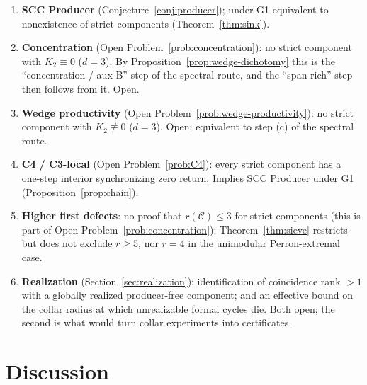 \documentclass[11pt]{amsart}
\theoremstyle{plain}
\theoremstyle{definition}
\theoremstyle{remark}
\newcommand{\cC}{\mathcal{C}}
\begin{document}
\begin{enumerate}[leftmargin=*]
\item \textbf{SCC Producer} (Conjecture~\ref{conj:producer}); under G1 equivalent to nonexistence of strict components (Theorem~\ref{thm:sink}).
\item \textbf{Concentration} (Open Problem~\ref{prob:concentration}): no strict component with $K_2\equiv0$ ($d=3$). By Proposition~\ref{prop:wedge-dichotomy} this is the ``concentration / aux-B'' step of the spectral route, and the ``span-rich'' step then follows from it. Open.
\item \textbf{Wedge productivity} (Open Problem~\ref{prob:wedge-productivity}): no strict component with $K_2\not\equiv0$ ($d=3$). Open; equivalent to step (c) of the spectral route.
\item \textbf{C4 / C3-local} (Open Problem~\ref{prob:C4}): every strict component has a one-step interior synchronizing zero return. Implies SCC Producer under G1 (Proposition~\ref{prop:chain}).
\item \textbf{Higher first defects}: no proof that $r(\cC)\le3$ for strict components (this is part of Open Problem~\ref{prob:concentration}); Theorem~\ref{thm:sieve} restricts but does not exclude $r\ge5$, nor $r=4$ in the unimodular Perron-extremal case.
\item \textbf{Realization} (Section~\ref{sec:realization}): identification of coincidence rank $>1$ with a globally realized producer-free component; and an effective bound on the collar radius at which unrealizable formal cycles die. Both open; the second is what would turn collar experiments into certificates.
\end{enumerate}

\section{Discussion}\label{sec:discussion}
\end{document}
